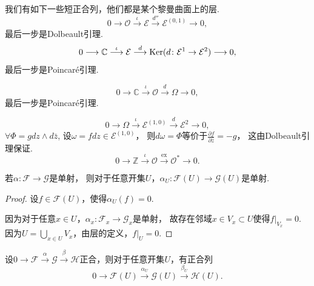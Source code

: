 \begin{example} 我们有如下一些短正合列，他们都是某个黎曼曲面上的层.
	$$0\longrightarrow \mathcal{O} \stackrel{\iota}{\longrightarrow} \mathcal{E} 
    \stackrel{d''}{\longrightarrow} \mathcal{E}^{(0,1)} \longrightarrow 0,$$
	最后一步是Dolbeault引理.
	$$0\longrightarrow \mathbb{C} \stackrel{\iota}{\longrightarrow} \mathcal{E} 
    \stackrel{d}{\longrightarrow} \operatorname{Ker}(d\colon \mathcal{E}^1\rightarrow \mathcal{E}^2) \longrightarrow 0,$$
	最后一步是Poincaré引理.
		
	$$0\longrightarrow \mathbb{C} \stackrel{\iota}{\longrightarrow} \mathcal{O} 
    \stackrel{d}{\longrightarrow} \Omega \longrightarrow 0,$$
	最后一步是Poincaré引理.
	
	$$0\rightarrow \Omega\stackrel{\iota}{\longrightarrow} \mathcal{E}^{(1,0)} 
    \stackrel{d}{\longrightarrow} \mathcal{E}^2 \rightarrow 0,$$
	$\forall \Phi=gdz\wedge d\bar{z}$, 
    设$\omega=fdz\in \mathcal{E}^{(1,0)}$，
    则$d\omega=\Phi$等价于$\frac{\partial f}{\partial \bar{z}}=-g$，
    这由Dolbeault引理保证.
	$$0\longrightarrow \mathbb{Z} \stackrel{\iota}{\longrightarrow} \mathcal{O} 
    \stackrel{\operatorname{ex}}{\longrightarrow} \mathcal{O}^* \longrightarrow 0.$$
\end{example}

\begin{lemma}\label{surjective}
	若$\alpha\colon \mathscr{F}\rightarrow \mathscr{G}$是单射，
    则对于任意开集$U$，$\alpha_U\colon \mathscr{F}(U)\rightarrow \mathscr{G}(U)$是单射.
\end{lemma}

\begin{proof}
	设$f\in \mathscr{F}(U)$，使得$\alpha_U(f)=0$.

	因为对于任意$x\in U$，$\alpha_x\colon \mathscr{F}_x\rightarrow \mathscr{G}_x$是单射，
    故存在邻域$x\in V_x\subset U$使得$f|_{V_x}=0$. 
    因为$U=\bigcup\limits_{x\in U} V_x$，由层的定义，$f|_U=0$.
\end{proof}

\begin{lemma}\label{exact}
	设$0\longrightarrow \mathscr{F}\stackrel{\alpha}{\longrightarrow} \mathscr{G} 
    \stackrel{\beta}{\longrightarrow} \mathscr{H}$正合，则对于任意开集$U$，有正合列
	$$0\longrightarrow \mathscr{F}(U)\stackrel{\alpha_U}{\longrightarrow} \mathscr{G}(U) 
    \stackrel{\beta_U}{\longrightarrow} \mathscr{H}(U).$$
\end{lemma}
		
